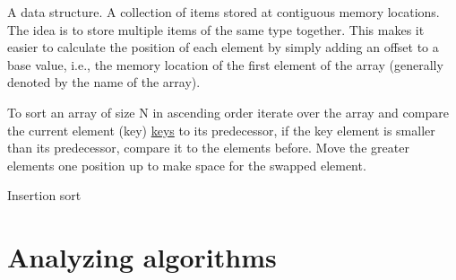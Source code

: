   \begin{definition}[Arrays]\label{def:arrays_1}
      A data structure. A collection of items stored at contiguous memory locations. The idea is to store multiple items of the same type together. This makes it easier to calculate the position of each element by simply adding an offset to a base value, i.e., the memory location of the first element of the array (generally denoted by the name of the array).
  \end{definition}

\begin{eg}
To sort an array of size N in ascending order iterate over the array and compare the current element (key) \hyperref[def:keys_1]{keys} to its predecessor, if the key element is smaller than its predecessor, compare it to the elements before. Move the greater elements one position up to make space for the swapped element.
\end{eg}

\begin{algorithm}
\caption{Insertion sort}\label{alg:insertion_sort_1}
  \For{$i\gets2$ \KwTo $n$}{
  $key = A[1]$ \tcp*{Assign variable "key" to the index "i" of array "A"}
  
  $j = i - 1$ \tcp*{ Insert $A[1]$ into the sorted sub-array $A[1 : i -1]$}
  
  \tcc{Conditional check while true}
  \While{$j > 0$ and $A[j] > key$}{
  $A[j + 1] = A[j]$ \tcp*{Retrive value at index "j" and assign this value to the element at index $j + 1$}
  
  $j = j - 1$} \tcp*{Swap $j$ with the value at index $j - 1$}
  $A]j + 1] = key$
  }

\end{algorithm}

\section{Analyzing algorithms}

